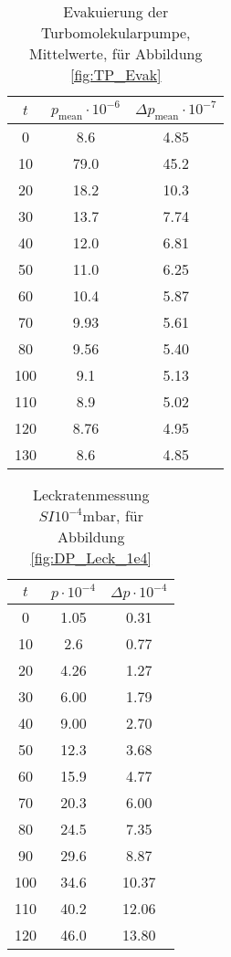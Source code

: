 \begin{table}[H]
    \centering
    \caption{Evakuierung der Turbomolekularpumpe, Mittelwerte, für Abbildung \ref{fig:TP_Evak}}
    \label{tab:TP_evak_mittelwert}
    \begin{tabular}{c c c}
        \toprule
        {$t$} & {$p_\text{mean} \cdot 10^{-6}$} & {$\Delta p_\text{mean} \cdot 10^{-7}$}\\
        \midrule
        0   & 8.6& 4.85  \\
        10  & 79.0 & 45.2  \\
        20  & 18.2 & 10.3\\
        30  & 13.7 & 7.74\\
        40  & 12.0 & 6.81\\
        50  & 11.0 & 6.25\\
        60  & 10.4 & 5.87\\
        70  & 9.93 & 5.61\\
        80  & 9.56& 5.40 \\
        100 & 9.1& 5.13  \\
        110 & 8.9& 5.02  \\
        120 & 8.76 & 4.95\\ 
        130 & 8.6& 4.85  \\
        \bottomrule
    \end{tabular}
\end{table}

\begin{table}[H]
    \centering
    \caption{Leckratenmessung $SI{10^{-4}} \si{\milli\bar}$, für Abbildung \ref{fig:DP_Leck_1e4}}
    \label{tab:}
    \begin{tabular}{c c c}
        \toprule
        {$t$} & {$p \cdot 10^{-4}$} & {$\Delta p \cdot 10^{-4}$} \\
        \midrule
        0 &   1.05 & 0.31\\
        10 &  2.6 & 0.77\\
        20 &  4.26 & 1.27\\
        30 &  6.00 & 1.79\\
        40 &  9.00 & 2.70\\
        50 &  12.3 & 3.68\\
        60 &  15.9 & 4.77\\
        70 &  20.3 & 6.00\\
        80 &  24.5 & 7.35\\
        90 &  29.6 & 8.87\\
        100 & 34.6 & 10.37\\
        110 & 40.2 & 12.06\\
        120 & 46.0 & 13.80\\
        \bottomrule
    \end{tabular}
\end{table}

